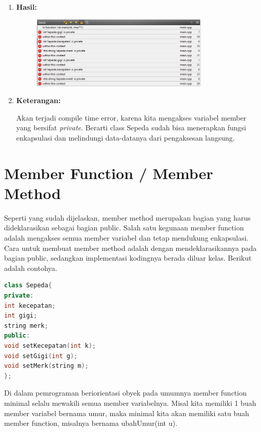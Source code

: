 \begin{enumerate}
\item 	\textbf{Hasil:}
	
	\begin{figure}[htbp]
		\centering
		\includegraphics[width=0.8\textwidth]{../manuscript/images/capture6-1.PNG}

	\end{figure}
	
\item 	\textbf{Keterangan:}
	
	Akan terjadi compile time error, karena kita mengakses variabel member
	yang bersifat \emph{private}. Berarti class Sepeda sudah bisa menerapkan
	fungsi enkapsulasi dan melindungi data-datanya dari pengaksesan
	langsung.
\end{enumerate}




\section{Member Function / Member
Method}\label{member-function-member-method}

Seperti yang sudah dijelaskan, member method merupakan bagian yang harus
dideklarasikan sebagai bagian public. Salah satu kegunaan member
function adalah mengakses semua member variabel dan tetap mendukung
enkapsulasi. Cara untuk membuat member method adalah dengan
mendeklarasikannya pada bagian public, sedangkan implementasi kodingnya
berada diluar kelas. Berikut adalah contohya.

\begin{lstlisting}[language=c++, numbers=none]
class Sepeda{
private:
int kecepatan;
int gigi;
string merk;
public:
void setKecepatan(int k);
void setGigi(int g);
void setMerk(string m);
};
\end{lstlisting}

Di dalam pemrograman beriorientasi obyek pada umumnya member function
minimal selalu mewakili semua member variabelnya. Misal kita memiliki 1
buah member variabel bernama umur, maka minimal kita akan memiliki satu
buah member function, misalnya bernama ubahUmur(int u).

